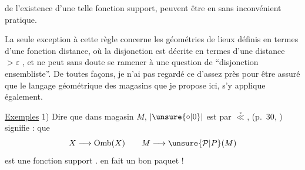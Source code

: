 
de l'existence d'une telle fonction support, peuvent être  en  sans inconvénient pratique.

La seule exception à cette règle concerne les géométries de lieux définis  en termes d'une fonction distance, où la disjonction est décrite en termes d'une distance $>\varepsilon$ , et ne peut sans doute se ramener à une question de  ``disjonction ensembliste''. De toutes façons, je n'ai pas regardé ce  d'assez près pour être assuré que le langage géométrique des magasins que je propose ici, s'y applique également.

\uline{Exemples} 1)  Dire que dans  magasin $M$,  $\lvert\unsure{\circ|0}\rvert$ est  par $\overset{\circ}{\ll}$, (p.~30, ) signifie : que
\[
 X \longrightarrow \mathrm{Omb}(X) \qquad M \longrightarrow \unsure{\mathcal{P}|P}(M)
\]
est une fonction support .   en fait un bon paquet !


